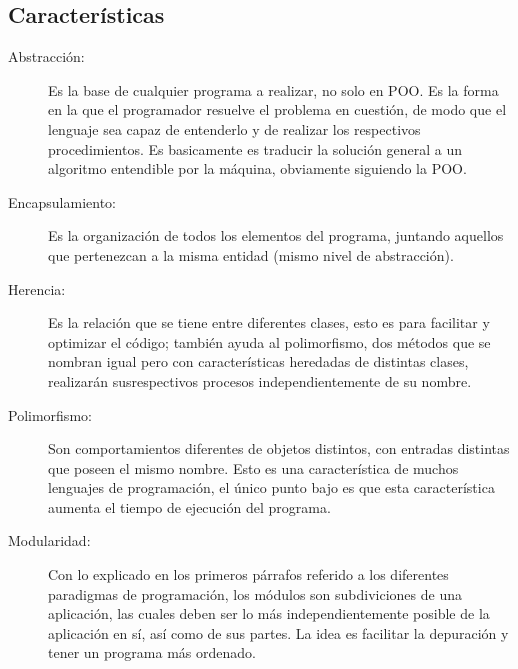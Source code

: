 \subsection{Características}
\begin{description}
	\item[Abstracción: ] Es la base de cualquier programa a realizar, no solo en POO. Es la forma en la que el programador resuelve el problema en cuestión, de modo que el lenguaje sea capaz de entenderlo y de realizar los respectivos procedimientos. Es basicamente es traducir la solución general a un algoritmo entendible por la máquina, obviamente siguiendo la POO.
	\item[Encapsulamiento: ] Es la organización de todos los elementos del programa, juntando aquellos que pertenezcan a la misma entidad (mismo nivel de abstracción).
	\item[Herencia: ] Es la relación que se tiene entre diferentes clases, esto es para facilitar y optimizar el código; también ayuda al polimorfismo, dos métodos que se nombran igual pero con características heredadas de distintas clases, realizarán susrespectivos procesos independientemente de su nombre.
	\item[Polimorfismo: ] Son comportamientos diferentes de objetos distintos, con entradas distintas que poseen el mismo nombre. Esto es una característica de muchos lenguajes de programación, el único punto bajo es que esta característica aumenta el tiempo de ejecución del programa.
	\item[Modularidad: ] Con lo explicado en los primeros párrafos referido a los diferentes paradigmas de programación, los módulos son subdiviciones de una aplicación, las cuales deben ser lo más independientemente posible de la aplicación en sí, así como de sus partes. La idea es facilitar la depuración y tener un programa más ordenado.
\end{description}
